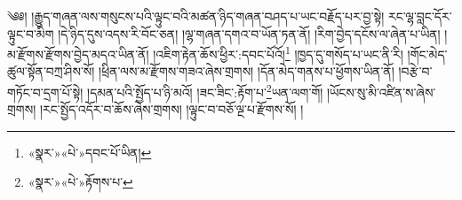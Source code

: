 ༄༅། །རྒྱུད་གཞན་ལས་གསུངས་པའི་ལྟུང་བའི་མཚན་ཉིད་གཞན་བཤད་པ་ཡང་བརྗོད་པར་བྱ་སྟེ། རང་ལྷ་བླང་དོར་ལྟུང་བ་མིག །དེ་ཉིད་དུས་འདས་རི་བོང་ཅན། །ལྷ་གཞན་དགའ་བ་ཡོན་ཏན་ནོ། །རིག་བྱེད་དངོས་ལ་ཞེན་པ་ཡིན། །མ་རྫོགས་རྫོགས་བྱེད་མདའ་ཡིན་ནོ། །འཇིག་རྟེན་ཆོས་ཕྱིར་:དབང་པོའོ།\footnote{«སྣར་»«པེ་»དབང་པོ་ཡིན།} །ཁྱད་དུ་གསོད་པ་ཡང་ནི་རི། །གོང་མེད་ཚུལ་སྟོན་བཀྲ་ཤིས་སོ། །ཕྲིན་ལས་མ་རྫོགས་གཟའ་ཞེས་གྲགས། །དོན་མེད་གནས་པ་ཕྱོགས་ཡིན་ནོ། །བརྩེ་བ་གཏོང་བ་དྲག་པོ་སྟེ། །དམན་པའི་སྤྱོད་པ་ཉི་མའོ། །ཟང་ཟིང་:རྟོག་པ་\footnote{«སྣར་»«པེ་»རྟོགས་པ་}ཡན་ལག་གོ། །ཡོངས་སུ་མི་འཛིན་ས་ཞེས་གྲགས། །རང་སྤྱོད་འདོར་བ་ཆོས་ཞེས་གྲགས། །ལྟུང་བ་བཅོ་ལྔ་པ་རྫོགས་སོ། ། 